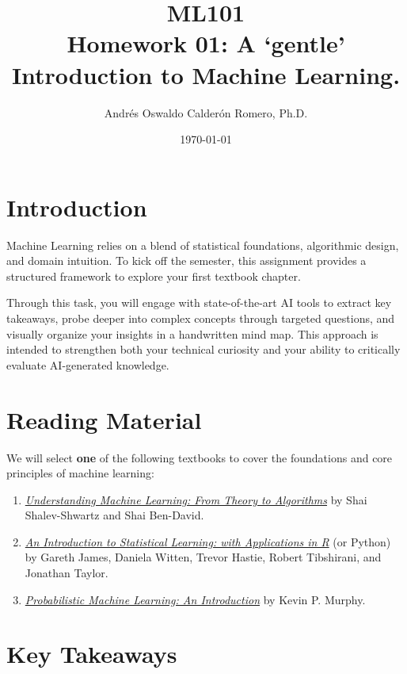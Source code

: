 \documentclass{article}
\title{ML101 \\ Homework 01: A `gentle' Introduction to Machine Learning.}
\author{Andrés Oswaldo Calderón Romero, Ph.D.}
\date{\today}
\begin{document}
\maketitle

\section{Introduction}
\label{sec:intro}

Machine Learning relies on a blend of statistical foundations, algorithmic design, and domain intuition. To kick off the semester, this assignment provides a structured framework to explore your first textbook chapter.

Through this task, you will engage with state-of-the-art AI tools to extract key takeaways, probe deeper into complex concepts through targeted questions, and visually organize your insights in a handwritten mind map. This approach is intended to strengthen both your technical curiosity and your ability to critically evaluate AI-generated knowledge.


\section{Reading Material}
\label{sec:reading}

We will select \textbf{one} of the following textbooks to cover the foundations and core principles of machine learning:

\begin{enumerate}
    \item \href{https://drive.google.com/file/d/1ZDwhMAk2n3qg3iXuIGzk_8Di6QqlwU6z/view?usp=sharing}{\textit{Understanding Machine Learning: From Theory to Algorithms}} by Shai Shalev-Shwartz and Shai Ben-David.

    \item \href{https://drive.google.com/file/d/1mT_na6JaKM1HbijdOQzESZwVWLdtwghc/view?usp=sharing}{\textit{An Introduction to Statistical Learning: with Applications in R}} (or Python) by Gareth James, Daniela Witten, Trevor Hastie, Robert Tibshirani, and Jonathan Taylor.

    \item \href{https://drive.google.com/file/d/1PCLoOU9XrA90_-roCY1aiSZItjLDDuGI/view?usp=sharing}{\textit{Probabilistic Machine Learning: An Introduction}} by Kevin P. Murphy.
\end{enumerate}

\section{Key Takeaways}
\label{sec:keypoints}
\end{document}
